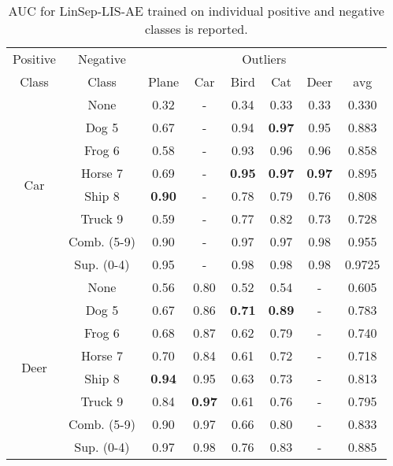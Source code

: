 \documentclass[acmtog, nonacm]{acmart}
\begin{document}
\begin{table}[]
\caption{AUC for LinSep-LIS-AE trained on individual positive and negative classes is reported.
}

\begin{tabular}{@{}c|c|ccccc|c@{}}
\midrule
Positive & Negative&\multicolumn{6}{c}{Outliers} \\
\hspace{.25em}Class &\hspace{.25em}Class & Plane & Car  & Bird & Cat  & Deer & avg\\
\midrule
\multirow{8}{*}{Car}    & None                      & 0.32  & -    & 0.34 & 0.33 & 0.33 & 0.330                \\
                          & Dog 5                     & 0.67  & -    & 0.94 & \bf0.97 & 0.95 & 0.883                \\
                          & Frog 6                    & 0.58  & -    & 0.93 & 0.96 & 0.96 & 0.858                \\
                          & Horse 7                   & 0.69  & -    & \bf0.95 & \bf0.97 & \bf0.97 & 0.895                \\
                          & Ship 8                    & \bf0.90  & -    & 0.78 & 0.79 & 0.76 & 0.808                \\
                          & Truck 9                   & 0.59  & -    & 0.77 & 0.82 & 0.73 & 0.728                \\
                          & Comb. (5-9)            & 0.90  & -    & 0.97 & 0.97 & 0.98 & 0.955                \\
                          & Sup. (0-4)          & 0.95  & -    & 0.98 & 0.98 & 0.98 & 0.9725               \\
                           \midrule
\multirow{8}{*}{Deer}   & None                      & 0.56  & 0.80 & 0.52 & 0.54 & -    & 0.605                \\
                          & Dog 5                     & 0.67  & 0.86 & \bf0.71 & \bf0.89 & -    & 0.783                \\
                          & Frog 6                    & 0.68  & 0.87 & 0.62 & 0.79 & -    & 0.740                \\
                          & Horse 7                   & 0.70  & 0.84 & 0.61 & 0.72 & -    & 0.718                \\
                          & Ship 8                    & \bf0.94  & 0.95 & 0.63 & 0.73 & -    & 0.813                \\
                          & Truck 9                   & 0.84  & \bf0.97 & 0.61 & 0.76 & -    & 0.795                \\
                          & Comb. (5-9)            & 0.90  & 0.97 & 0.66 & 0.80 & -    & 0.833                \\
                          & Sup. (0-4)          & 0.97  & 0.98 & 0.76 & 0.83 & -    & 0.885             \\
\midrule
\end{tabular}
\end{table}
\end{document}
